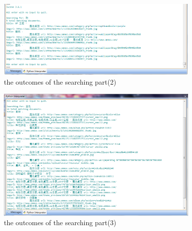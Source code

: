 \documentclass{article}
\begin{document}
\begin{figure}[htbp]
\centering
\includegraphics[width=10cm]{27.png}
\caption{the outcomes of the searching part(2)}
\end{figure}
\begin{figure}[htbp]
\centering
\includegraphics[width=10cm]{28.png}
\caption{the outcomes of the searching part(3)}
\end{figure}
\end{document}
